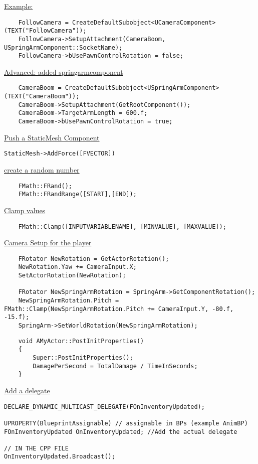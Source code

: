             \uline{Example:}
            \begin{lstlisting}
    FollowCamera = CreateDefaultSubobject<UCameraComponent>(TEXT("FollowCamera"));
    FollowCamera->SetupAttachment(CameraBoom, USpringArmComponent::SocketName);
    FollowCamera->bUsePawnControlRotation = false;
            \end{lstlisting}

            \uline{Advanced: added springarmcomponent}
            \begin{lstlisting}
    CameraBoom = CreateDefaultSubobject<USpringArmComponent>(TEXT("CameraBoom"));
	CameraBoom->SetupAttachment(GetRootComponent());
	CameraBoom->TargetArmLength = 600.f;
	CameraBoom->bUsePawnControlRotation = true;
            \end{lstlisting}

        \uline{Push a StaticMesh Component}
\begin{lstlisting}
StaticMesh->AddForce([FVECTOR])
\end{lstlisting}
\smallskip
        \uline{create a random number}
        \begin{lstlisting}
    FMath::FRand();
    FMath::FRandRange([START],[END]);
        \end{lstlisting}
\smallskip
        \uline{Clamp values}
        \begin{lstlisting}
    FMath::Clamp([INPUTVARIABLENAME], [MINVALUE], [MAXVALUE]);
        \end{lstlisting}
\smallskip
        \uline{Camera Setup for the player}
        \begin{lstlisting}
    FRotator NewRotation = GetActorRotation();
    NewRotation.Yaw += CameraInput.X;
    SetActorRotation(NewRotation);

    FRotator NewSpringArmRotation = SpringArm->GetComponentRotation();
    NewSpringArmRotation.Pitch = FMath::Clamp(NewSpringArmRotation.Pitch += CameraInput.Y, -80.f, -15.f);
    SpringArm->SetWorldRotation(NewSpringArmRotation);
        \end{lstlisting}
\smallskip
        \begin{lstlisting}
    void AMyActor::PostInitProperties()
    {
        Super::PostInitProperties();
        DamagePerSecond = TotalDamage / TimeInSeconds;
    }
        \end{lstlisting}
\smallskip
        \uline{Add a delegate}
\begin{lstlisting}
DECLARE_DYNAMIC_MULTICAST_DELEGATE(FOnInventoryUpdated);

UPROPERTY(BlueprintAssignable) // assignable in BPs (example AnimBP)
FOnInventoryUpdated OnInventoryUpdated; //Add the actual delegate

// IN THE CPP FILE
OnInventoryUpdated.Broadcast();
\end{lstlisting}

